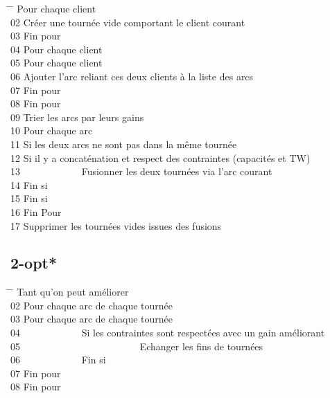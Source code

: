 \documentclass[12pt]{article}
\begin{document}
\begin{tabbing}
\hspace{1cm} \= \hspace{1cm} \=   Pour chaque client\\
02  \> Créer une tournée vide comportant le client courant\\
03  Fin pour\\
04  Pour chaque client\\
05  \> Pour chaque client\\
06  \> \> Ajouter l'arc reliant ces deux clients à la liste des arcs \\
07  \> Fin pour \\
08  Fin pour \\
09  Trier les arcs par leurs gains \\
10  Pour chaque arc \\
11  \> Si les deux arcs ne sont pas dans la même tournée \\
12  \> \> Si il y a concaténation et respect des contraintes (capacités et TW)\\
13  \> \> \ \ \ \ \ \ \ \ \ \ \ \ Fusionner les deux tournées via l'arc courant \\
14  \> \> Fin si \\
15  \> Fin si \\
16  Fin Pour \\
17  Supprimer les tournées vides issues des fusions \\
\end{tabbing}

\subsection{2-opt*}

\begin{tabbing}
\hspace{1cm} \= \hspace{1cm} \=   Tant qu'on peut améliorer\\
02  \> Pour chaque arc de chaque tournée\\
03  \> \> Pour chaque arc de chaque tournée \\
04  \> \> \ \ \ \ \ \ \ \ \ \ \ \ Si les contraintes sont respectées avec un gain améliorant \\
05  \> \> \ \ \ \ \ \ \ \ \ \ \ \ \ \ \ \ \ \ \ \ \ \ \ \ Echanger les fins de tournées\\
06  \> \> \ \ \ \ \ \ \ \ \ \ \ \ Fin si \\
07  \> \> Fin pour \\
08  Fin pour \\
\end{tabbing}
\end{document}
